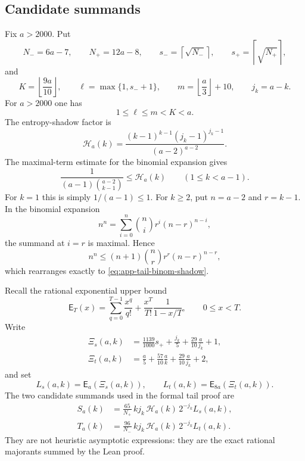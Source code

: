 \documentclass[11pt]{article}
\theoremstyle{definition}
\theoremstyle{remark}
\newcommand{\PE}{\mathsf E}
\newcommand{\floor}[1]{\left\lfloor #1\right\rfloor}
\newcommand{\ceil}[1]{\left\lceil #1\right\rceil}
\begin{document}
\subsection{Candidate summands}

Fix $a>2000$.  Put
\begin{equation}\label{eq:app-tail-edges}
 N_-=6a-7,\qquad N_+=12a-8,\qquad
 s_- = \ceil{\sqrt{N_-}},\qquad s_+=\ceil{\sqrt{N_+}},
\end{equation}
and
\begin{equation}\label{eq:app-tail-indices}
 K=\floor{\frac{9a}{10}},\qquad
 \ell=\max\{1,s_-+1\},\qquad
 m=\floor{\frac a3}+10,\qquad j_k=a-k.
\end{equation}
For $a>2000$ one has
\begin{equation}\label{eq:app-tail-order}
 1\le \ell\le m<K<a.
\end{equation}
The entropy-shadow factor is
\begin{equation}\label{eq:app-tail-H}
 \mathcal H_a(k)=
 \frac{(k-1)^{k-1}(j_k-1)^{j_k-1}}{(a-2)^{a-2}}.
\end{equation}
The maximal-term estimate for the binomial expansion gives
\begin{equation}\label{eq:app-tail-binom-shadow}
 \frac{1}{(a-1)\binom{a-2}{k-1}}
 \le \mathcal H_a(k)
 \qquad (1\le k<a-1).
\end{equation}
For $k=1$ this is simply $1/(a-1)\le1$.  For $k\ge2$, put
$n=a-2$ and $r=k-1$.  In the binomial expansion
\[
 n^n=\sum_{i=0}^{n}\binom ni r^i(n-r)^{n-i},
\]
the summand at $i=r$ is maximal.  Hence
\[
 n^n\le(n+1)\binom nr r^r(n-r)^{n-r},
\]
which rearranges exactly to \eqref{eq:app-tail-binom-shadow}.

Recall the rational exponential upper bound
\begin{equation}\label{eq:app-tail-PE}
 \PE_T(x)=\sum_{q=0}^{T-1}\frac{x^q}{q!}
 +\frac{x^T}{T!}\frac{1}{1-x/T},
 \qquad 0\le x<T.
\end{equation}
Write
\begin{align}
 \Xi_s(a,k)
  &=\frac{1139}{1000}s_+
    +\frac{j_k}{5}+\frac{29}{10}\frac{a}{j_k}+1,
 \label{eq:app-tail-Es}\\
 \Xi_t(a,k)
  &=\frac a5+\frac{57}{10}\frac{a}{k}
    +\frac{29}{10}\frac{a}{j_k}+2,
 \label{eq:app-tail-Et}
\end{align}
and set
\begin{equation}\label{eq:app-tail-LsLt}
 L_s(a,k)=\PE_a(\Xi_s(a,k)),\qquad
 L_t(a,k)=\PE_{8a}(\Xi_t(a,k)).
\end{equation}
The two candidate summands used in the formal tail proof are
\begin{align}
 S_a(k)
  &=\frac{65}{N_+}\,k j_k\,\mathcal H_a(k)\,2^{-j_k}L_s(a,k),
 \label{eq:app-tail-S}\\
 T_a(k)
  &=\frac{96}{N_-}\,k j_k\,\mathcal H_a(k)\,2^{-j_k}L_t(a,k).
 \label{eq:app-tail-T}
\end{align}
They are not heuristic asymptotic expressions: they are the exact rational
majorants summed by the Lean proof.
\end{document}
